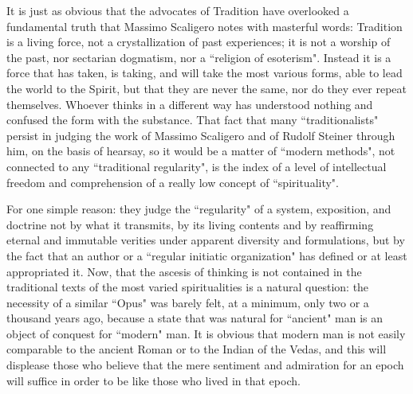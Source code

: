 It is just as obvious that the advocates of Tradition have overlooked a fundamental truth that Massimo Scaligero notes with masterful words: Tradition is a living force, not a crystallization of past experiences; it is not a worship of the past, nor sectarian dogmatism, nor a ``religion of esoterism". Instead it is a force that has taken, is taking, and will take the most various forms, able to lead the world to the Spirit, but that they are never the same, nor do they ever repeat themselves. Whoever thinks in a different way has understood nothing and confused the form with the substance. That fact that many ``traditionalists" persist in judging the work of Massimo Scaligero and of Rudolf Steiner through him, on the basis of hearsay, so it would be a matter of ``modern methods", not connected to any ``traditional regularity", is the index of a level of intellectual freedom and comprehension of a really low concept of ``spirituality".

For one simple reason: they judge the ``regularity" of a system, exposition, and doctrine not by what it transmits, by its living contents and by reaffirming eternal and immutable verities under apparent diversity and formulations, but by the fact that an author or a ``regular initiatic organization" has defined or at least appropriated it. Now, that the ascesis of thinking is not contained in the traditional texts of the most varied spiritualities is a natural question: the necessity of a similar ``Opus" was barely felt, at a minimum, only two or a thousand years ago, because a state that was natural for ``ancient" man is an object of conquest for ``modern" man. It is obvious that modern man is not easily comparable to the ancient Roman or to the Indian of the Vedas, and this will displease those who believe that the mere sentiment and admiration for an epoch will suffice in order to be like those who lived in that epoch.

